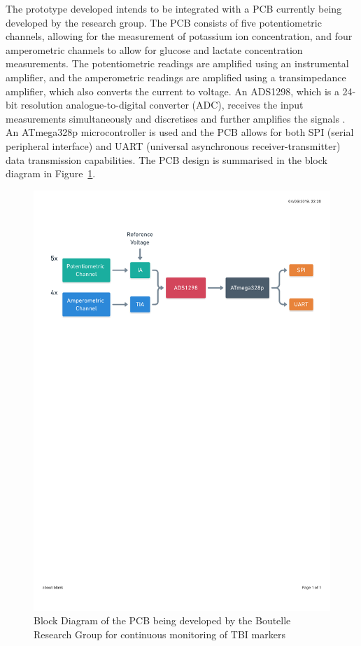 The prototype developed intends to be integrated with a PCB currently being developed by the research group. The PCB consists of five potentiometric channels, allowing for the measurement of potassium ion concentration, and four amperometric channels to allow for glucose and lactate concentration measurements. The potentiometric readings are amplified using an instrumental amplifier, and the amperometric readings are amplified using a transimpedance amplifier, which also converts the current to voltage. An ADS1298, which is a 24-bit resolution analogue-to-digital converter (ADC), receives the input measurements simultaneously and discretises and further amplifies the signals \cite{TexasInstruments2010}. An ATmega328p microcontroller is used and the PCB allows for both SPI (serial peripheral interface) and UART (universal asynchronous receiver-transmitter) data transmission capabilities. The PCB design is summarised in the block diagram in Figure~\ref{fig: PCB block diagram}.

\begin{figure}[h!]
\centering
\includegraphics[trim={0cm 20.5cm 0.5cm  2.9cm}, clip, width=1\textwidth]{./figures/CircuitBlockDiagram.pdf}
\captionsetup{justification=centering}
\caption{Block Diagram of the PCB being developed by the Boutelle Research Group for continuous monitoring of TBI markers}
\label{fig: PCB block diagram}
\end{figure}

